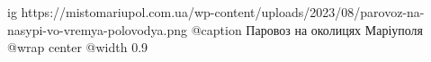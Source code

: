  
 
 
 
 

\ifcmt
  ig https://mistomariupol.com.ua/wp-content/uploads/2023/08/parovoz-na-nasypi-vo-vremya-polovodya.png
	@caption Паровоз на околицях Маріуполя
  @wrap center
  @width 0.9
\fi
